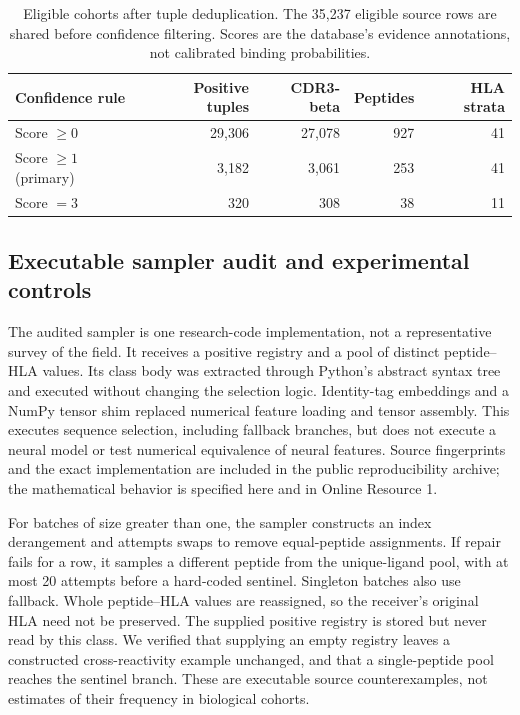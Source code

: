 \documentclass[pdflatex,sn-basic]{sn-jnl}
\begin{document}
\begin{table}[t]
\caption{Eligible cohorts after tuple deduplication. The 35,237 eligible source rows are shared before confidence filtering. Scores are the database's evidence annotations, not calibrated binding probabilities.}\label{tab:cohort}
\centering
\begin{tabular}{lrrrr}
\toprule
Confidence rule & Positive tuples & CDR3-beta & Peptides & HLA strata\\
\midrule
Score $\geq0$ & 29,306 & 27,078 & 927 & 41\\
Score $\geq1$ (primary) & 3,182 & 3,061 & 253 & 41\\
Score $=3$ & 320 & 308 & 38 & 11\\
\bottomrule
\end{tabular}
\end{table}

\subsection{Executable sampler audit and experimental controls}
The audited sampler is one research-code implementation, not a representative survey of the field. It receives a positive registry and a pool of distinct peptide--HLA values. Its class body was extracted through Python's abstract syntax tree and executed without changing the selection logic. Identity-tag embeddings and a NumPy tensor shim replaced numerical feature loading and tensor assembly. This executes sequence selection, including fallback branches, but does not execute a neural model or test numerical equivalence of neural features. Source fingerprints and the exact implementation are included in the public reproducibility archive; the mathematical behavior is specified here and in Online Resource 1.

For batches of size greater than one, the sampler constructs an index derangement and attempts swaps to remove equal-peptide assignments. If repair fails for a row, it samples a different peptide from the unique-ligand pool, with at most 20 attempts before a hard-coded sentinel. Singleton batches also use fallback. Whole peptide--HLA values are reassigned, so the receiver's original HLA need not be preserved. The supplied positive registry is stored but never read by this class. We verified that supplying an empty registry leaves a constructed cross-reactivity example unchanged, and that a single-peptide pool reaches the sentinel branch. These are executable source counterexamples, not estimates of their frequency in biological cohorts.
\end{document}
